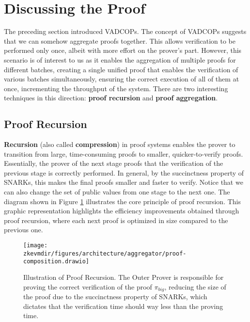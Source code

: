 \section{Discussing the Proof}

The preceding section introduced VADCOPs. The concept of VADCOPs suggests that we can somehow aggregate proofs together. This allows verification to be performed only once, albeit with more effort on the prover's part. However, this scenario is of interest to us as it enables the aggregation of multiple proofs for different batches, creating a single unified proof that enables the verification of various batches simultaneously, ensuring the correct execution of all of them at once, incrementing the throughput of the system. There are two interesting techniques in this direction: \textbf{proof recursion} and \textbf{proof aggregation}.

\subsection{Proof Recursion}

\textbf{Recursion} (also called \textbf{compression}) in proof systems enables the prover to transition from large, time-consuming proofs to smaller, quicker-to-verify proofs. Essentially, the prover of the next stage proofs that the verification of the previous stage is correctly performed. In general, by the succinctness property of SNARKs, this makes the final proofs smaller and faster to verify. Notice that we can also change the set of public values from one stage to the next one. The diagram shown in Figure \ref{fig:proof-recursion} illustrates the core principle of proof recursion. This graphic representation highlights the efficiency improvements obtained through proof recursion, where each next proof is optimized in size compared to the previous one.

\begin{figure}[H]
\centering
\texttt{[image: \\zkevmdir/figures/architecture/aggregator/proof-composition.drawio]}
\caption{Illustration of Proof Recursion. The Outer Prover is responsible for proving the correct verification of the proof $\pi_{big}$, reducing the size of the proof due to the succinctness property of SNARKs, which dictates that the verification time should way less than the proving time.}
\label{fig:proof-recursion}
\end{figure}




